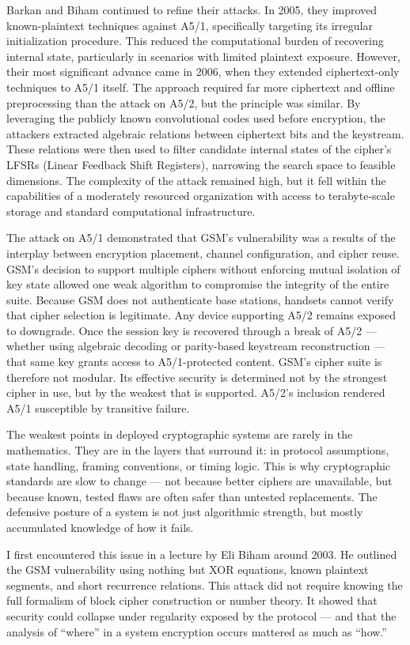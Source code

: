 Barkan and Biham continued to refine their attacks. In 2005, they improved known-plaintext techniques against A5/1, specifically targeting its irregular initialization procedure. This reduced the computational burden of recovering internal state, particularly in scenarios with limited plaintext exposure. However, their most significant advance came in 2006, when they extended ciphertext-only techniques to A5/1 itself. The approach required far more ciphertext and offline preprocessing than the attack on A5/2, but the principle was similar. By leveraging the publicly known convolutional codes used before encryption, the attackers extracted algebraic relations between ciphertext bits and the keystream. These relations were then used to filter candidate internal states of the cipher’s LFSRs (Linear Feedback Shift Registers), narrowing the search space to feasible dimensions. The complexity of the attack remained high, but it fell within the capabilities of a moderately resourced organization with access to terabyte-scale storage and standard computational infrastructure.

The attack on A5/1 demonstrated that GSM’s vulnerability was a results of the interplay between encryption placement, channel configuration, and cipher reuse. GSM’s decision to support multiple ciphers without enforcing mutual isolation of key state allowed one weak algorithm to compromise the integrity of the entire suite. Because GSM does not authenticate base stations, handsets cannot verify that cipher selection is legitimate. Any device supporting A5/2 remains exposed to downgrade. Once the session key is recovered through a break of A5/2 — whether using algebraic decoding or parity-based keystream reconstruction — that same key grants access to A5/1-protected content. GSM’s cipher suite is therefore not modular. Its effective security is determined not by the strongest cipher in use, but by the weakest that is supported. A5/2’s inclusion rendered A5/1 susceptible by transitive failure.

\begin{commentary}

The weakest points in deployed cryptographic systems are rarely in the mathematics. They are in the layers that surround it: in protocol assumptions, state handling, framing conventions, or timing logic. This is why cryptographic standards are slow to change — not because better ciphers are unavailable, but because known, tested flaws are often safer than untested replacements. The defensive posture of a system is not just algorithmic strength, but mostly accumulated knowledge of how it fails.

I first encountered this issue in a lecture by Eli Biham around 2003. He outlined the GSM vulnerability using nothing but XOR equations, known plaintext segments, and short recurrence relations. This attack did not require knowing the full formalism of block cipher construction or number theory. It showed that security could collapse under regularity exposed by the protocol — and that the analysis of “where” in a system encryption occurs mattered as much as “how.”

\end{commentary}